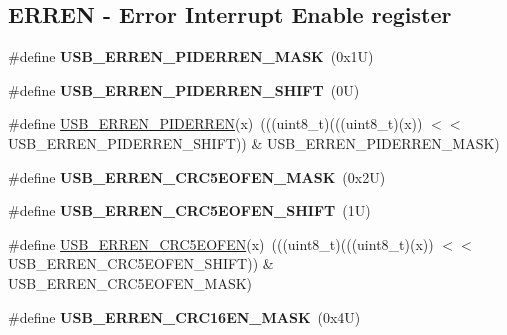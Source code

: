 \subsection*{E\+R\+R\+EN -\/ Error Interrupt Enable register}
\begin{DoxyCompactItemize}
\item 
\mbox{\label{group___u_s_b___register___masks_ga971e0d8939196ec3990a73b4db4030ad}} 
\#define {\bfseries U\+S\+B\+\_\+\+E\+R\+R\+E\+N\+\_\+\+P\+I\+D\+E\+R\+R\+E\+N\+\_\+\+M\+A\+SK}~(0x1\+U)
\item 
\mbox{\label{group___u_s_b___register___masks_ga47a2a895b1b94a32aa482d11173e2fb9}} 
\#define {\bfseries U\+S\+B\+\_\+\+E\+R\+R\+E\+N\+\_\+\+P\+I\+D\+E\+R\+R\+E\+N\+\_\+\+S\+H\+I\+FT}~(0\+U)
\item 
\#define \mbox{\hyperlink{group___u_s_b___register___masks_gac8aff57d3636da4ea876d6b9666eb9c8}{U\+S\+B\+\_\+\+E\+R\+R\+E\+N\+\_\+\+P\+I\+D\+E\+R\+R\+EN}}(x)~(((uint8\+\_\+t)(((uint8\+\_\+t)(x)) $<$$<$ U\+S\+B\+\_\+\+E\+R\+R\+E\+N\+\_\+\+P\+I\+D\+E\+R\+R\+E\+N\+\_\+\+S\+H\+I\+FT)) \& U\+S\+B\+\_\+\+E\+R\+R\+E\+N\+\_\+\+P\+I\+D\+E\+R\+R\+E\+N\+\_\+\+M\+A\+SK)
\item 
\mbox{\label{group___u_s_b___register___masks_gafab72bb1aedf0d529c720a25d6ee93da}} 
\#define {\bfseries U\+S\+B\+\_\+\+E\+R\+R\+E\+N\+\_\+\+C\+R\+C5\+E\+O\+F\+E\+N\+\_\+\+M\+A\+SK}~(0x2\+U)
\item 
\mbox{\label{group___u_s_b___register___masks_gafc8288624f2373be283f408a290f3daf}} 
\#define {\bfseries U\+S\+B\+\_\+\+E\+R\+R\+E\+N\+\_\+\+C\+R\+C5\+E\+O\+F\+E\+N\+\_\+\+S\+H\+I\+FT}~(1\+U)
\item 
\#define \mbox{\hyperlink{group___u_s_b___register___masks_ga0fdb8376f0e47f96561ee2953e225ff6}{U\+S\+B\+\_\+\+E\+R\+R\+E\+N\+\_\+\+C\+R\+C5\+E\+O\+F\+EN}}(x)~(((uint8\+\_\+t)(((uint8\+\_\+t)(x)) $<$$<$ U\+S\+B\+\_\+\+E\+R\+R\+E\+N\+\_\+\+C\+R\+C5\+E\+O\+F\+E\+N\+\_\+\+S\+H\+I\+FT)) \& U\+S\+B\+\_\+\+E\+R\+R\+E\+N\+\_\+\+C\+R\+C5\+E\+O\+F\+E\+N\+\_\+\+M\+A\+SK)
\item 
\mbox{\label{group___u_s_b___register___masks_gae216c42729f6b3d992001136744fe341}} 
\#define {\bfseries U\+S\+B\+\_\+\+E\+R\+R\+E\+N\+\_\+\+C\+R\+C16\+E\+N\+\_\+\+M\+A\+SK}~(0x4\+U)

\end{DoxyCompactItemize}
